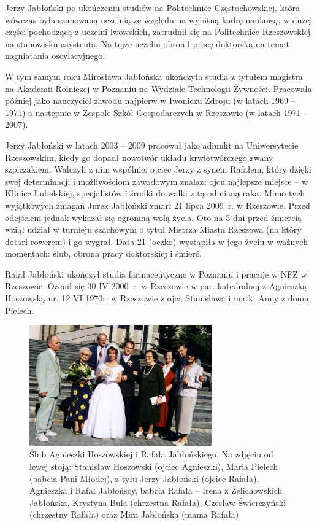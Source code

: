 Jerzy Jabłoński po ukończeniu studiów na Politechnice Częstochowskiej, która wówczas była szanowaną uczelnią ze względu na wybitną kadrę naukową, w dużej części pochodzącą z uczelni lwowskich, zatrudnił się na Politechnice Rzeszowskiej na stanowisku asystenta. Na tejże uczelni obronił pracę doktorską na temat nagniatania oscylacyjnego. 

W tym samym roku Mirosława Jabłońska ukończyła studia z tytułem magistra na Akademii Rolniczej w Poznaniu na Wydziale Technologii Żywności. Pracowała później jako nauczyciel zawodu najpierw w Iwoniczu Zdroju (w latach 1969 – 1971) a następnie w Zespole Szkół Gospodarczych w Rzeszowie (w latach 1971 – 2007). 

Jerzy Jabłoński w latach 2003 -- 2009 pracował jako adiunkt na Uniwersytecie Rzeszowskim, kiedy go dopadł nowotwór układu krwiotwórczego zwany szpiczakiem. Walczyli z nim wspólnie: ojciec Jerzy z synem Rafałem, który dzięki swej determinacji i możliwościom zawodowym znalazł ojcu najlepsze miejsce -- w Klinice Lubelskiej, specjalistów i środki do walki z tą odmianą raka. Mimo tych wyjątkowych zmagań Jurek Jabłoński zmarł 21 lipca 2009~r. w Rzeszowie. Przed odejściem jednak wykazał się ogromną wolą życia.
Oto na 5 dni przed śmiercią wziął udział w turnieju szachowym o tytuł Mistrza Miasta Rzeszowa (na który dotarł rowerem) i go wygrał. Data 21 (oczko) wystąpiła w jego życiu w ważnych momentach: ślub, obrona pracy doktorskiej i śmierć.

Rafał Jabłoński ukończył studia farmaceutyczne w Poznaniu i pracuje w NFZ w Rzeszowie. Ożenił się 30 IV 2000~r. w Rzeszowie w par. katedralnej z Agnieszką Hoszowską ur. 12 VI 1970r. w Rzeszowie z ojca Stanisława i matki Anny z domu Pielech.

\begin{figure}
\begin{center}
\includegraphics[width=0.7\textwidth]{zdjecia/slub_rafala_i_agnieszki_jablonskich.jpg}
\caption[Ślub Agnieszki Hoszowskiej z Rafałem Jabłońskim]{Ślub Agnieszki Hoszowskiej i Rafała Jabłońskiego. Na zdjęciu od lewej stoją: Stanisław Hoszowski (ojciec Agnieszki), Maria Pielech (babcia Pani Młodej), z tyłu Jerzy Jabłoński (ojciec Rafała), Agnieszka i Rafał Jabłońscy, babcia Rafała -- Irena z Żelichowskich Jabłońska, Krystyna Bula (chrzestna Rafała), Czesław Świerczyński (chrzestny Rafała) oraz Mira Jabłońska (mama Rafała)}
\label{rys:slub_rafala_i_agnieszki_jablonskich}
\end{center}
\end{figure}

